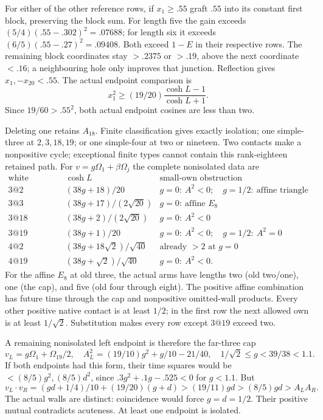 For either of the other reference
rows, if \(x_1\ge.55\) graft \(.55\)
into its constant first block,
preserving the block sum.
For length five the gain exceeds
\((5/4)(.55-.302)^2=.07688\);
for length six it exceeds
\((6/5)(.55-.27)^2=.09408\).
Both exceed \(1-E\) in their
respective rows.
The remaining block coordinates
stay \(>.2375\) or \(>.19\),
above the next coordinate \(<.16\);
a neighbouring hole only improves
that junction.
Reflection gives
\(x_1,-x_{20}<.55\).
The actual endpoint comparison is
\[
               x_1^2\ge(19/20)
                       \frac{\cosh L-1}{\cosh L+1}.
\]
Since \(19/60>.55^2\), both actual
endpoint cosines are less than two.

Deleting one retains \(A_{18}\).
Finite classification gives exactly
isolation; one simple-three at
\(2,3,18,19\); or one simple-four
at two or nineteen.
Two contacts make a nonpositive
cycle; exceptional finite types
cannot contain this rank-eighteen
retained path.
For \(v=g\Omega_1+\beta\Omega_j\)
the complete nonisolated data are
\[
\begin{array}{c|c|l}
 \text{white contact}&\cosh L&\text{small-own obstruction}\\ \hline
 3@2&(38g+18)/20&g=0:\ A^2<0;\quad g=1/2:\ \text{affine triangle}\\
 3@3&(38g+17)/(2\sqrt{20})&g=0:\ \text{affine }E_8\\
 3@18&(38g+2)/(2\sqrt{20})&g=0:\ A^2<0\\
 3@19&(38g+1)/20&g=0:\ A^2<0;\quad g=1/2:\ A^2=0\\
 4@2&(38g+18\sqrt2)/\sqrt{40}&\text{already }>2\text{ at }g=0\\
 4@19&(38g+\sqrt2)/\sqrt{40}&g=0:\ A^2<0 .
\end{array}
\]
For the affine \(E_8\) at old three,
the actual arms have lengths
two (old two/one), one (the cap),
and five (old four through eight).
The positive affine combination has
future time through the cap and
nonpositive omitted-wall products.
Every other positive native contact
is at least \(1/2\); in the first
row the next allowed own is at
least \(1/\sqrt2\).
Substitution makes every row
except \(3@19\) exceed two.

A remaining nonisolated left endpoint
is therefore the far-three cap
\[
 v_L=g\Omega_1+\Omega_{19}/2,\quad
 A_L^2=(19/10)g^2+g/10-21/40,\quad
                    1/\sqrt2\le g<39/38<1.1 .
\]
If both endpoints had this form,
their time squares would be
\(<(8/5)g^2,(8/5)d^2\), since
\(.3g^2+.1g-.525<0\) for \(g<1.1\).
But
\[
 v_L\cdot v_R=(gd+1/4)/10+(19/20)(g+d)
                        >(19/11)gd>(8/5)gd>A_LA_R .
\]
The actual walls are distinct:
coincidence would force \(g=d=1/2\).
Their positive mutual contradicts
acuteness.
At least one endpoint is isolated.


